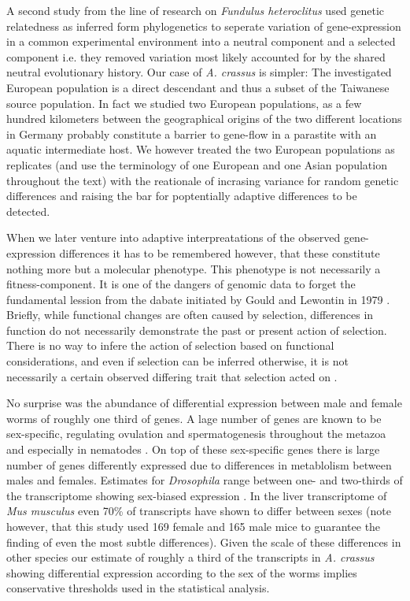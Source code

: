 A second study from the line of research on \textit{Fundulus
  heteroclitus} \cite{pmid16567645} used genetic relatedness as
inferred form phylogenetics to seperate variation of gene-expression
in a common experimental environment into a neutral component and a
selected component i.e. they removed variation most likely accounted
for by the shared neutral evolutionary history. Our case of
\textit{A. crassus} is simpler: The investigated European population
is a direct descendant and thus a subset of the Taiwanese source
population. In fact we studied two European populations, as a few
hundred kilometers between the geographical origins of the two
different locations in Germany probably constitute a barrier to
gene-flow in a parastite with an aquatic intermediate host. We however
treated the two European populations as replicates (and use the
terminology of one European and one Asian population throughout the
text) with the reationale of incrasing variance for random genetic
differences and raising the bar for poptentially adaptive differences
to be detected.

When we later venture into adaptive interpreatations of the observed
gene-expression differences it has to be remembered however, that
these constitute nothing more but a molecular phenotype. This
phenotype is not necessarily a fitness-component. It is one of the
dangers of genomic data to forget the fundamental lession from the
dabate initiated by Gould and Lewontin in 1979
\cite{gould_spandrels_1979}. Briefly, while functional changes are
often caused by selection, differences in function do not necessarily
demonstrate the past or present action of selection. There is no way
to infere the action of selection based on functional considerations,
and even if selection can be inferred otherwise, it is not necessarily
a certain observed differing trait that selection acted on
\cite{pmid19744124}.

No surprise was the abundance of differential expression between male
and female worms of roughly one third of genes. A lage number of genes
are known to be sex-specific, regulating ovulation and spermatogenesis
throughout the metazoa and especially in nematodes
\cite{pmid15371532}. On top of these sex-specific genes there is large
number of genes differently expressed due to differences in
metablolism between males and females. Estimates for
\textit{Drosophila} range between one- and two-thirds of the
transcriptome showing sex-biased expression \cite{pmid11726925}. In
the liver transcriptome of \textit{Mus musculus} even 70\% of
transcripts have shown to differ between sexes \cite{pmid16825664}
(note however, that this study used 169 female and 165 male mice to
guarantee the finding of even the most subtle differences). Given the
scale of these differences in other species our estimate of roughly a
third of the transcripts in \textit{A. crassus} showing differential
expression according to the sex of the worms implies conservative
thresholds used in the statistical analysis.

